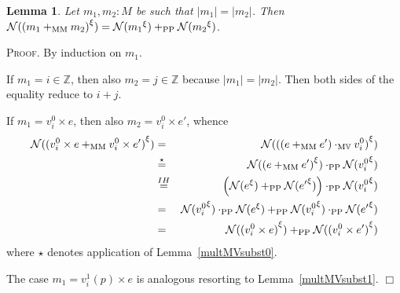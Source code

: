\documentclass{article}
\newtheorem{lemma}[definition]{Lemma}
\newenvironment{proof}{\smallskip\textsc{Proof.}}{\hspace*{\fill}$\Box$}
\newcommand{\N}{{\cal N}}
\newcommand{\Z}{{\mathbb Z}}
\newcommand{\V}{{\mathbb V}}
\newcommand{\renamevar}[2]{\ensuremath{{#1}^{#2}}}
\newcommand{\multMV}{\ensuremath{\cdot_{\mathrm M\V}}}
\newcommand{\plusMM}{\ensuremath{+_{\mathrm{MM}}}}
\newcommand{\plusPP}{\ensuremath{+_{\mathrm{PP}}}}
\newcommand{\multPP}{\ensuremath{\cdot_{\mathrm{PP}}}}
\begin{document}
\begin{lemma}\label{plusMMsubst} Let $m_1,m_2:M$ be such that $|m_1|=|m_2|$.
Then $\N(\renamevar{(m_1\plusMM m_2)}\xi)%
=\N(\renamevar{m_1}\xi)\plusPP\N(\renamevar{m_2}\xi)$.
\end{lemma}
\begin{proof}
By induction on $m_1$.

If $m_1=i\in\Z$, then also $m_2=j\in\Z$ because $|m_1|=|m_2|$.  Then
both sides of the equality reduce to $i+j$.

If $m_1=v^0_i\times e$, then also $m_2=v^0_i\times e'$, whence
\begin{eqnarray*}
\N(\renamevar{(v^0_i\times e\plusMM v^0_i\times e')}\xi)
 & = & \N(\renamevar{((e\plusMM e')\multMV v^0_i)}\xi) \\
 & \stackrel{\star}= &
       \N(\renamevar{(e\plusMM e')}\xi)\multPP\N(\renamevar{v^0_i}\xi) \\
 & \stackrel{IH}= & \left(\N(\renamevar e\xi)\plusPP%
       \N(\renamevar{e'}\xi)\right)\multPP\N(\renamevar{v^0_i}\xi) \\
 & = & \N(\renamevar{v^0_i}\xi)\multPP\N(\renamevar e\xi)\plusPP%
       \N(\renamevar{v^0_i}\xi)\multPP\N(\renamevar{e'}\xi) \\
 & = & \N(\renamevar{(v^0_i\times e)}\xi)\plusPP
       \N(\renamevar{(v^0_i\times e')}\xi)
\end{eqnarray*}
where $\star$ denotes application of Lemma~\ref{multMVsubst0}.

The case $m_1=v^1_i(p)\times e$ is analogous resorting to
Lemma~\ref{multMVsubst1}.
\end{proof}
\end{document}
